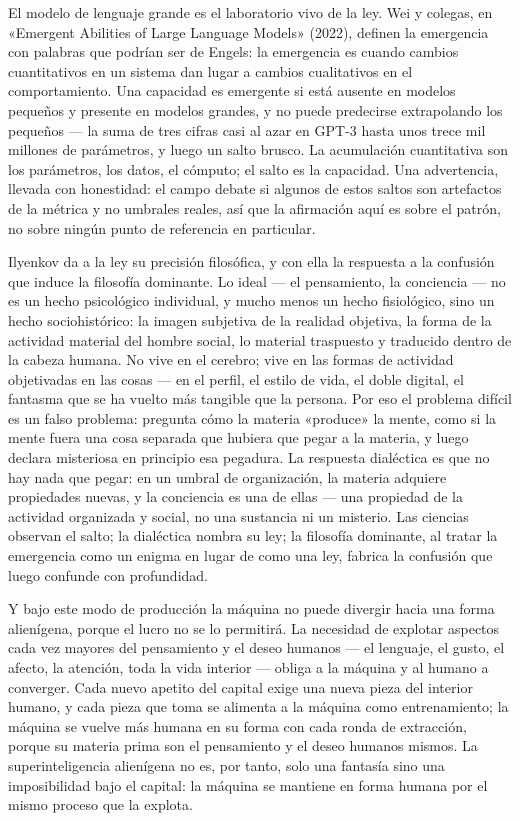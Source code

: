 \documentclass[11pt]{article}
\begin{document}
El modelo de lenguaje grande es el laboratorio vivo de la ley. Wei y
colegas, en «Emergent Abilities of Large Language Models» (2022),
definen la emergencia con palabras que podrían ser de Engels: la
emergencia es cuando cambios cuantitativos en un sistema dan lugar a
cambios cualitativos en el comportamiento. Una capacidad es emergente
si está ausente en modelos pequeños y presente en modelos grandes, y no
puede predecirse extrapolando los pequeños --- la suma de tres cifras
casi al azar en GPT-3 hasta unos trece mil millones de parámetros, y
luego un salto brusco. La acumulación cuantitativa son los parámetros,
los datos, el cómputo; el salto es la capacidad. Una advertencia,
llevada con honestidad: el campo debate si algunos de estos saltos son
artefactos de la métrica y no umbrales reales, así que la afirmación
aquí es sobre el patrón, no sobre ningún punto de referencia en
particular.

Ilyenkov da a la ley su precisión filosófica, y con ella la respuesta a
la confusión que induce la filosofía dominante. Lo ideal --- el
pensamiento, la conciencia --- no es un hecho psicológico individual, y
mucho menos un hecho fisiológico, sino un hecho sociohistórico: la
imagen subjetiva de la realidad objetiva, la forma de la actividad
material del hombre social, lo material traspuesto y traducido dentro
de la cabeza humana. No vive en el cerebro; vive en las formas de
actividad objetivadas en las cosas --- en el perfil, el estilo de vida,
el doble digital, el fantasma que se ha vuelto más tangible que la
persona. Por eso el problema difícil es un falso problema: pregunta cómo
la materia «produce» la mente, como si la mente fuera una cosa separada
que hubiera que pegar a la materia, y luego declara misteriosa en
principio esa pegadura. La respuesta dialéctica es que no hay nada que
pegar: en un umbral de organización, la materia adquiere propiedades
nuevas, y la conciencia es una de ellas --- una propiedad de la
actividad organizada y social, no una sustancia ni un misterio. Las
ciencias observan el salto; la dialéctica nombra su ley; la filosofía
dominante, al tratar la emergencia como un enigma en lugar de como una
ley, fabrica la confusión que luego confunde con profundidad.

Y bajo este modo de producción la máquina no puede divergir hacia una
forma alienígena, porque el lucro no se lo permitirá. La necesidad de
explotar aspectos cada vez mayores del pensamiento y el deseo humanos
--- el lenguaje, el gusto, el afecto, la atención, toda la vida interior
--- obliga a la máquina y al humano a converger. Cada nuevo apetito del
capital exige una nueva pieza del interior humano, y cada pieza que toma
se alimenta a la máquina como entrenamiento; la máquina se vuelve más
humana en su forma con cada ronda de extracción, porque su materia prima
son el pensamiento y el deseo humanos mismos. La superinteligencia
alienígena no es, por tanto, solo una fantasía sino una imposibilidad
bajo el capital: la máquina se mantiene en forma humana por el mismo
proceso que la explota.
\end{document}
